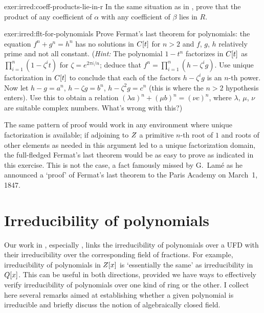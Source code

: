 \begin{exer}{}{exer:irred:coeff-products-lie-in-r}
  In the same situation as in
  , prove that the
  product of any coefficient of $\alpha$ with any coefficient of
  $\beta$ lies in $R$.
\end{exer}
\begin{exer}{}{exer:irred:flt-for-polynomials}
  Prove Fermat's last theorem for polynomials: the equation
  $f^n + g^n = h^n$ has no solutions in $C[t]$ for $n > 2$ and $f$,
  $g$, $h$ relatively prime and not all constant. (\emph{Hint:} The
  polynomial $1 - t^n$ factorizes in $C[t]$ as
  $\prod_{i=1}^{n}(1 - \zeta^i t)$
  for $\zeta = e^{2\pi i/n}$; deduce that
  $f^n = \prod_{i=1}^{n}(h - \zeta^i g)$. Use unique factorization in
  $C[t]$ to conclude that each of the factors $h - \zeta^i g$ is an
  $n$-th power. Now let $h - g = a^n$, $h - \zeta g = b^n$,
  $h - \zeta^2 g = c^n$ (this is where the $n > 2$ hypothesis enters).
  Use this to obtain a relation
  $(\lambda a)^n + (\mu b)^n = (\nu c)^n$, where $\lambda$, $\mu$,
  $\nu$ are suitable complex numbers. What's wrong with this?)

  The same pattern of proof would work in any environment where unique
  factorization is available; if adjoining to $Z$ a primitive $n$-th
  root of $1$ and roots of other elements as needed in this argument
  led to a unique factorization domain, the full-fledged Fermat's
  last theorem would be as easy to prove as indicated in this
  exercise.  This is not the case, a fact famously missed by G.\
  Lam\'e as he announced a `proof' of Fermat's last theorem to the
  Paris Academy on March~1, 1847.
\end{exer}

\section{Irreducibility of polynomials}
\label{sec:irred:irreducibility-of-polynomials}

Our work in , especially
, links the irreducibility of polynomials over a
UFD with their irreducibility over the corresponding field of
fractions. For example, irreducibility of polynomials in $Z[x]$ is
`essentially the same' as irreducibility in $Q[x]$. This can be
useful in both directions, provided we have ways to effectively verify
irreducibility of polynomials over one kind of ring or the other. I
collect here several remarks aimed at establishing whether a given
polynomial is irreducible and briefly discuss the notion of
algebraically closed field.


